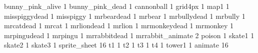 bunny_pink_alive 1
bunny_pink_dead 1
cannonball 1
grid4px 1
map1 1
misspiggydead 1
misspiggy 1
mrbeardead 1
mrbear 1
mrbullydead 1
mrbully 1
mrcatdead 1
mrcat 1
mrliondead 1
mrlion 1
mrmonkeydead 1
mrmonkey 1
mrpingudead 1
mrpingu 1
mrrabbitdead 1
mrrabbit_animate 2
poison 1
skate1 1
skate2 1
skate3 1
sprite_sheet 16
t1 1
t2 1
t3 1
t4 1
tower1 1
animate 16

